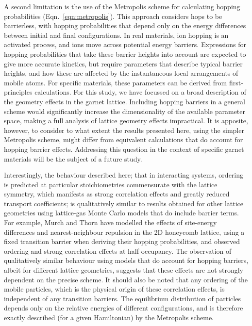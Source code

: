 \documentclass[aps,prb,twocolumn,superscriptaddress,reprint]{revtex4-1}
\begin{document}
A second limitation is the use of the Metropolis scheme for calculating hopping probabilities (Eqn.~\ref{eqn:metropolis}). This approach considers hops to be barrierless, with hopping probabilities that depend only on the energy differences between initial and final configurations. In real materials, ion hopping is an activated process, and ions move across potential energy barriers. Expressions for hopping probabilities that take these barrier heights into account are expected to give more accurate kinetics, but require parameters that describe typical barrier heights, and how these are affected by the instantaneous local arrangements of mobile atoms.\cite{SingerAndPeschel_ZPhysikBCondensedMatter1980, VanderVenAndCeder_HandbookofMaterialsModelling2010} For specific materials, these parameters can be derived from first-principles calculations.\cite{VenEtAl_PhysRevB2001,VenAndCeder_PhysRevLett2005,LeeEtAl_PhysRevB2011, GrieshammerEtAl_PhysChemChemPhys2014} For this study, we have focussed on a broad description of the geometry effects in the garnet lattice. Including hopping barriers in a general scheme would significantly increase the dimensionality of the available parameter space, making a full analysis of  lattice geometry effects impractical. It is apposite, however, to consider to what extent the results presented here, using the simpler Metropolis scheme, might differ from equivalent calculations that do account for hopping barrier effects. Addressing this question in the context of specific garnet materials will be the subject of a future study. 

Interestingly, the behaviour described here; that in interacting systems, ordering is predicted at particular stoichiometries commensurate with the lattice symmetry, which manifests as strong correlation effects and greatly reduced transport coefficients; is qualitatively similar to results obtained for other lattice geometries using lattice-gas Monte Carlo models that do include barrier terms. For example, Murch and Thorn have modelled the effects of site-energy differences and nearest-neighbour repulsion in the 2D honeycomb lattice, using a fixed transition barrier when deriving their hopping probabilities, and observed ordering and strong correlation effects at half-occupancy.\cite{MurchAndThorn_PhilMag1977a,MurchAndThorn_PhilMag1977b,MurchAndThorn_PhilMag1977c} The observation of qualitatively similar behaviour using models that do account for hopping barriers, albeit for different lattice geometries, suggests that these effects are not strongly dependent on the precise scheme. It should also be noted that any ordering of the mobile particles, which is the physical origin of these correlation effects, is independent of any transition barriers. The equilibrium distribution of particles depends only on the relative energies of different configurations, and is therefore exactly described (for a given Hamiltonian) by the Metropolis scheme. 
\end{document}
